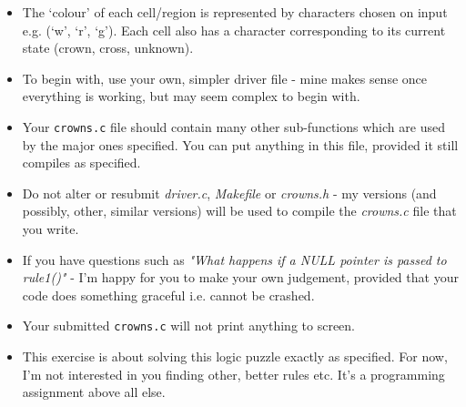 \begin{exercise}
\begin{itemize}
\item The `colour' of each cell/region is represented by characters
chosen on input e.g. (`w', `r', `g'). Each cell also has a character
corresponding to its current state (crown, cross, unknown).

\item To begin with, use your own, simpler driver file - mine makes
sense once everything is working, but may seem complex to begin with.

\item Your \verb^crowns.c^ file should contain many other sub-functions
which are used by the major ones specified. You can put anything in this
file, provided it still compiles as specified.

\item Do not alter or resubmit {\em driver.c}, {\em Makefile} or {\em
crowns.h} - my versions (and possibly, other, similar versions) will be
used to compile the {\em crowns.c} file that you write.

\item If you have questions such as {\em "What happens if a NULL pointer
is passed to rule1()"} - I'm happy for you to make your own judgement,
provided that your code does something graceful i.e. cannot be crashed.

\item Your submitted \verb^crowns.c^ will not print anything to screen.

\item This exercise is about solving this logic puzzle exactly as
specified.  For now, I'm not interested in you finding other, better
rules etc. It's a programming assignment above all else.

\end{itemize}

\end{exercise}
